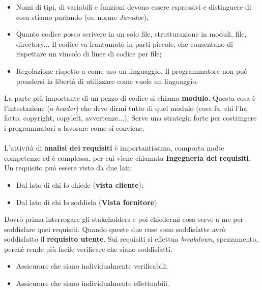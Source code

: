\begin{itemize}

	\item Nomi di tipi, di variabili e funzioni devono essere espressivi e distinguere di cosa stiamo parlando (es. norme \textit{Javadoc});
	\item Quanto codice posso scrivere in un solo file, strutturazione in moduli, file, directory... Il codice va frantumato in parti piccole, che consentano di rispettare un vincolo di linee di codice per file;
	\item Regolazione rispetto a come uso un linguaggio. Il programmatore non può prendersi la libertà di utilizzare come vuole un linguaggio.

\end{itemize}

La parte più importante di un pezzo di codice si chiama \textbf{modulo}. Questa cosa è l'intestazione (o \textit{header}) che deve dirmi tutto di quel modulo (cosa fa, chi l'ha fatto, copyright, copyleft, avvertenze...). Serve una strategia forte per costringere i programmatori a lavorare come si conviene.\\\\

L'attività di \textbf{analisi dei requisiti} è importantissima, comporta molte competenze ed è complessa, per cui viene chiamata \textbf{Ingegneria dei requisiti}. Un requisito può essere visto da due lati:

\begin{itemize}

	\item Dal lato di chi lo chiede (\textbf{vista cliente});
	\item Dal lato di chi lo soddisfa (\textbf{Vista fornitore})

\end{itemize}

Dovrò prima interrogare gli stakeholders e poi chiedermi cosa serve a me per soddisfare quei requisiti. Quando queste due cose sono soddisfatte avrò soddisfatto il \textbf{requisito utente}. Sui requisiti si effettua \textit{breakdown}, spezzamento, perchè rende più facile verificare che siano soddisfatti.

\begin{itemize}

	\item Assicurare che siano individualmente verificabili;
	\item Assicurare che siano individualmente effettuabili.

\end{itemize}

